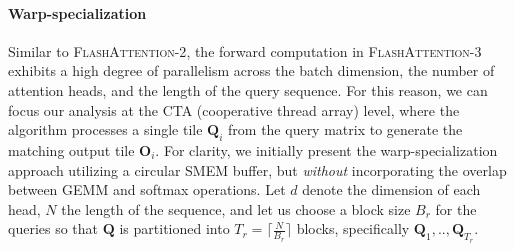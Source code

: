 \paragraph{Warp-specialization}
Similar to \textsc{FlashAttention-2}, the forward computation in \textsc{FlashAttention-3} exhibits a high degree of parallelism across the batch dimension, the number of attention heads, and the length of the query sequence. For this reason, we can focus our analysis at the CTA (cooperative thread array) level, where the algorithm processes a single tile $\mathbf{Q}_i$ from the query matrix to generate the matching output tile $\mathbf{O}_i$. For clarity, we initially present the warp-specialization approach utilizing a circular SMEM buffer, but \emph{without} incorporating the overlap between GEMM and softmax operations. Let $d$ denote the dimension of each head, $N$ the length of the sequence, and let us choose a block size $B_r$ for the queries so that $\mathbf{Q}$ is partitioned into $T_r = \lceil \frac{N}{B_r} \rceil$ blocks, specifically $\mathbf{Q}_1, .., \mathbf{Q}_{T_r}$.

